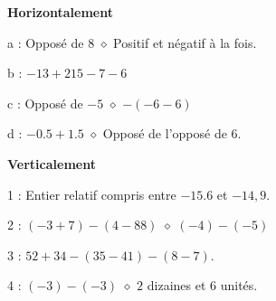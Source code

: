 
\begin{exercice}\label{exo2smath-0219}

\begin{center}
   
\end{center}

{\bf Horizontalement}

a : Opposé de $8$ $\diamond$ Positif et négatif à la fois.

b : $-13+215-7-6$

c : Opposé de \( -5\) $\diamond$ \( -(-6-6)\)

d : $-0.5+1.5$ $\diamond$ Opposé de l'opposé de \( 6\).

{\bf Verticalement}

1 : Entier relatif compris entre $-15.6$ et $-14,9$.

2 : $(-3+7)-(4-88)$ $\diamond$ $(-4)-(-5)$

3 : $52+34-(35-41) -(8-7)$.

4 : $(-3)-(-3)$ $\diamond$ $2$ dizaines et $6$ unités.

\end{exercice}
